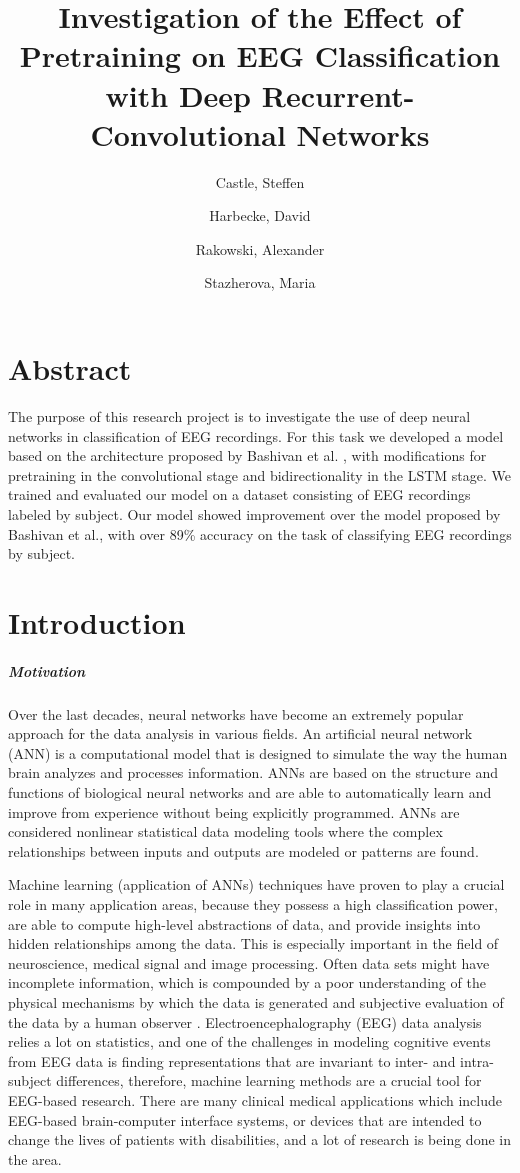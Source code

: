 \documentclass{article}
\title{Investigation of the Effect of Pretraining on EEG Classification with Deep Recurrent-Convolutional Networks}
\author{Castle, Steffen \and Harbecke, David \and Rakowski, Alexander \and Stazherova, Maria}
\begin{document}
\maketitle
{}
	

\maketitle

\section*{Abstract}
The purpose of this research project is to investigate the use of deep neural networks in classification of EEG recordings. For this task we developed a model based on the architecture proposed by Bashivan et al. \cite{learning_eeg_repr}, with modifications for pretraining in the convolutional stage and bidirectionality in the LSTM stage. We trained and evaluated our model on a dataset consisting of EEG recordings labeled by subject. Our model showed improvement over the model proposed by Bashivan et al., with over 89\% accuracy on the task of classifying EEG recordings by subject. 

\section{Introduction}
\subparagraph{Motivation} Over the last decades, neural networks have become an extremely popular approach for the data analysis in various fields. An artificial neural network (ANN) is a computational model that is designed to simulate the way the human brain analyzes and processes information. ANNs are based on the structure and functions of biological neural networks and are able to automatically learn and improve from experience without being explicitly programmed. ANNs are considered nonlinear statistical data modeling tools where the complex relationships between inputs and outputs are modeled or patterns are found.

Machine learning (application of ANNs) techniques have proven to play a crucial role in many application areas, because they possess a high classification power, are able to compute high-level abstractions of data, and provide insights into hidden relationships among the data. This is especially important in the field of neuroscience, medical signal and image processing. Often data sets might have incomplete information, which is compounded by a poor understanding of the physical mechanisms by which the data is generated and subjective evaluation of the data by a human observer \cite{roberts}. Electroencephalography (EEG) data analysis relies a lot on statistics, and one of the challenges in modeling cognitive events from EEG data is finding representations that are invariant to inter- and intra-subject differences, therefore, machine learning methods are a crucial tool for EEG-based research. There are many clinical medical applications which include EEG-based brain-computer interface systems, or devices that are intended to change the lives of patients with disabilities, and a lot of research is being done in the area.
\end{document}
